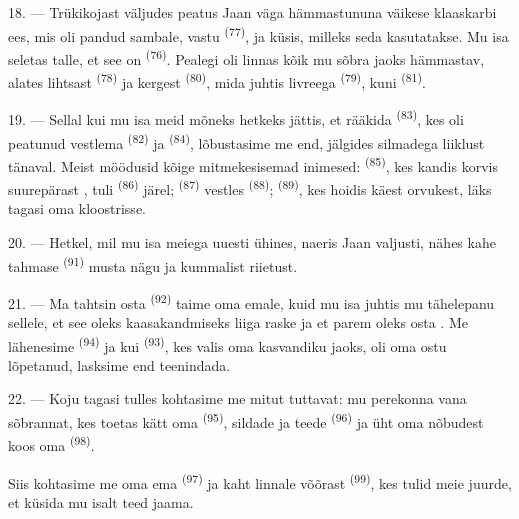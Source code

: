 18. --- Trükikojast väljudes peatus Jaan väga hämmastununa väikese klaaskarbi ees, mis
oli pandud sambale, vastu  \textsuperscript{(77)}, ja küsis, milleks
seda kasutatakse. Mu isa seletas talle, et see on 
\textsuperscript{(76)}. Pealegi oli linnas kõik mu sõbra jaoks hämmastav, alates lihtsast
 \textsuperscript{(78)} ja kergest 
\textsuperscript{(80)}, mida juhtis livreega  \textsuperscript{(79)}, kuni
 \textsuperscript{(81)}.

19. --- Sellal kui mu isa meid mõneks hetkeks jättis, et rääkida 
\textsuperscript{(83)}, kes oli peatunud vestlema 
\textsuperscript{(82)} ja  \textsuperscript{(84)}, lõbustasime me end,
jälgides silmadega liiklust tänaval. Meist möödusid kõige mitmekesisemad inimesed:
 \textsuperscript{(85)}, kes kandis korvis suurepärast
, tuli  \textsuperscript{(86)} järel;
 \textsuperscript{(87)} vestles 
\textsuperscript{(88)};  \textsuperscript{(89)}, kes hoidis käest orvukest,
läks tagasi oma kloostrisse.

\VUsaut{3.0mm}

20. --- Hetkel, mil mu isa meiega uuesti ühines, naeris Jaan valjusti, nähes kahe
tahmase  \textsuperscript{(91)} musta nägu ja kummalist riietust.

21. --- Ma tahtsin osta  \textsuperscript{(92)} taime oma emale,
kuid mu isa juhtis mu tähelepanu sellele, et see oleks kaasakandmiseks liiga raske ja
et parem oleks osta . Me lähenesime 
\textsuperscript{(94)} ja kui  \textsuperscript{(93)}, kes valis oma
kasvandiku jaoks, oli oma ostu lõpetanud, lasksime end teenindada.

22. --- Koju tagasi tulles kohtasime me mitut tuttavat: mu perekonna vana sõbrannat,
kes toetas kätt oma  \textsuperscript{(95)}, sildade ja teede
 \textsuperscript{(96)} ja üht oma nõbudest koos oma
 \textsuperscript{(98)}.

Siis kohtasime me oma ema  \textsuperscript{(97)} ja kaht linnale
võõrast  \textsuperscript{(99)}, kes tulid meie juurde, et küsida mu isalt
teed jaama.

\VUsaut{6.0mm}
\VUfilet{22mm}
